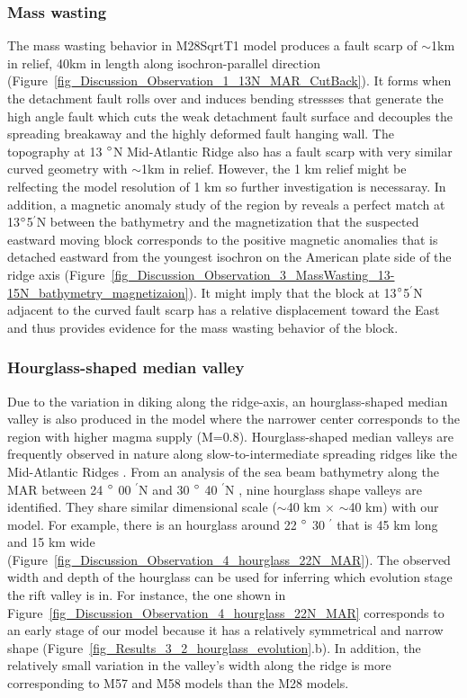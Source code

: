 \documentclass[draft,gc]{agutex}
\begin{document}
\begin{article}
\subsubsection{Mass wasting}
The mass wasting behavior in M28SqrtT1 model produces a fault scarp of $\sim$1km in relief, 40km in length along isochron-parallel direction (Figure~\ref{fig_Discussion_Observation_1_13N_MAR_CutBack}). It forms when the detachment fault rolls over and induces bending stressses that generate the high angle fault which cuts the weak detachment fault surface and decouples the spreading breakaway and the highly deformed fault hanging wall. The topography at 13 $\degree$N Mid-Atlantic Ridge also has a fault scarp with very similar curved geometry with $\sim$1km in relief. However, the 1 km relief might be relfecting the model resolution of 1 km so further investigation is necessaray. In addition, a magnetic anomaly study of the region by \citep{Smith2008} reveals a perfect match at 13$\degree$5$^{\prime}$N between the bathymetry and the magnetization that the suspected eastward moving block corresponds to the positive magnetic anomalies that is detached eastward from the youngest isochron on the American plate side of the ridge axis (Figure~\ref{fig_Discussion_Observation_3_MassWasting_13-15N_bathymetry_magnetizaion}). It might imply that the block at 13$\degree$5$^{\prime}$N adjacent to the curved fault scarp has a relative displacement toward the East and thus provides evidence for the mass wasting behavior of the block.   

\subsubsection{Hourglass-shaped median valley}
Due to the variation in diking along the ridge-axis, an hourglass-shaped median valley is also produced in the model where the narrower center corresponds to the region with higher magma supply (M=$0.8$). Hourglass-shaped median valleys are frequently observed in nature along slow-to-intermediate spreading ridges like the Mid-Atlantic Ridges \citep{Sempere1993}. From an analysis of the sea beam bathymetry along the MAR between 24 $\degree$ 00 $^{\prime}$N and 30 $\degree$ 40 $^{\prime}$N \citep{Sempere1993}, nine hourglass shape valleys are identified. They share similar dimensional scale ($\sim$40 km $\times$ $\sim$40 km) with our model. For example, there is an hourglass around 22 $\degree$ 30 $^{\prime}$ that is 45 km long and 15 km wide (Figure~\ref{fig_Discussion_Observation_4_hourglass_22N_MAR}). The observed width and depth of the hourglass can be used for inferring which evolution stage the rift valley is in. For instance, the one shown in Figure~\ref{fig_Discussion_Observation_4_hourglass_22N_MAR} corresponds to an early stage of our model because it has a relatively symmetrical and narrow shape (Figure~\ref{fig_Results_3_2_hourglass_evolution}.b). In addition, the relatively small variation in the valley's width along the ridge is more corresponding to M57 and M58 models than the M28 models.


\end{article}
\end{document}
